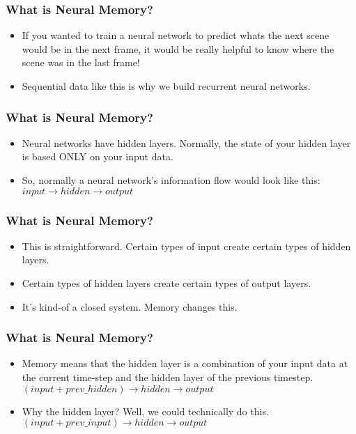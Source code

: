 \begin{frame}[fragile] \frametitle{What is Neural Memory?}

\begin{itemize}
\item If you wanted to train a neural network to predict whats the next scene would be in the next frame, it would be really helpful to know where the scene was in the last frame! 
\item Sequential data like this is why we build recurrent neural networks.
\end{itemize}
\end{frame}

\begin{frame}[fragile] \frametitle{What is Neural Memory?}

\begin{itemize}
\item Neural networks have hidden layers. Normally, the state of your hidden layer is based ONLY on your input data. 
\item So, normally a neural network's information flow would look like this:
$input \rightarrow hidden  \rightarrow  output$
\end{itemize}
\end{frame}


\begin{frame}[fragile] \frametitle{What is Neural Memory?}

\begin{itemize}
\item This is straightforward. Certain types of input create certain types of hidden layers. 
\item Certain types of hidden layers create certain types of output layers. 
\item It's kind-of a closed system. Memory changes this. 
\end{itemize}
\end{frame}


\begin{frame}[fragile] \frametitle{What is Neural Memory?}
\begin{itemize}
\item Memory means that the hidden layer is a combination of your input data at the current time-step and the hidden layer of the previous timestep.
$ (input + prev\_hidden) \rightarrow hidden \rightarrow output$
\item Why the hidden layer? Well, we could technically do this. 
$(input + prev\_input) \rightarrow hidden \rightarrow output$
\end{itemize}
\end{frame}

